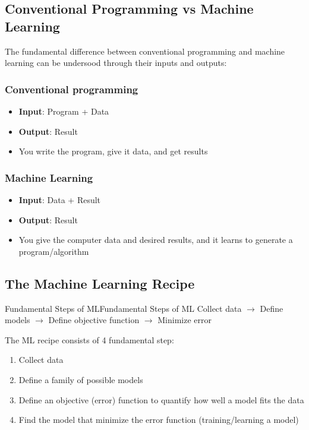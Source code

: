 \documentclass[a4paper]{article}
\theoremstyle{definition}
\begin{document}
\subsection{Conventional Programming vs Machine Learning}
The fundamental difference between conventional programming and machine learning can be undersood through their inputs and outputs:
\subsubsection{Conventional programming}
\begin{itemize}
    \item \textbf{Input}: Program + Data 
    \item \textbf{Output}: Result
    \item You write the program, give it data, and get results
\end{itemize}
\subsubsection{Machine Learning}
\begin{itemize}
    \item \textbf{Input}: Data + Result 
    \item \textbf{Output}: Result 
    \item You give the computer data and desired results, and it learns to generate a program/algorithm
\end{itemize}
\subsection{The Machine Learning Recipe}
\begin{definition}{Fundamental Steps of ML}{Fundamental Steps of ML}
Collect data \( \rightarrow \) Define models \( \rightarrow \) Define objective function \( \rightarrow \) Minimize error
\end{definition}
The ML recipe consists of 4 fundamental step:
\begin{enumerate}
    \item Collect data 
    \item Define a family of possible models
    \item Define an objective (error) function to quantify how well a model fits the data 
    \item Find the model that minimize the error function (training/learning a model)
\end{enumerate}
\end{document}
